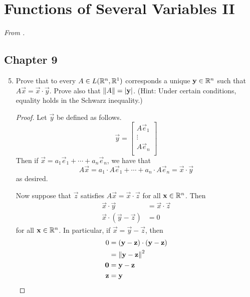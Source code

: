 \documentclass[../psets.tex]{subfiles}
\begin{document}
\section{Functions of Several Variables II}
\emph{From \textcite{bib:Rudin}.}
\subsection*{Chapter 9}
\begin{enumerate}[label={\textbf{\arabic*.}}]
    \setcounter{enumi}{4}
    \item {}Prove that to every $A\in L(\mathbb{R}^n,\mathbb{R}^1)$ corresponds a unique $\mathbf{y}\in\mathbb{R}^n$ such that $A\vec{x}=\vec{x}\cdot\vec{y}$. Prove also that $\norm{A}=|\mathbf{y}|$. (Hint: Under certain conditions, equality holds in the Schwarz inequality.)
    \begin{proof}
        Let $\vec{y}$ be defined as follows.
        \begin{equation*}
            \vec{y} =
            \begin{bmatrix}
                A\vec{e}_1\\
                \vdots\\
                A\vec{e}_n\\
            \end{bmatrix}
        \end{equation*}
        Then if $\vec{x}=a_1\vec{e}_1+\cdots+a_n\vec{e}_n$, we have that
        \begin{equation*}
            A\vec{x} = a_1\cdot A\vec{e}_1+\cdots+a_n\cdot A\vec{e}_n
            = \vec{x}\cdot\vec{y}
        \end{equation*}
        as desired.\par
        Now suppose that $\vec{z}$ satisfies $A\vec{x}=\vec{x}\cdot\vec{z}$ for all $\mathbf{x}\in\mathbb{R}^n$. Then
        \begin{align*}
            \vec{x}\cdot\vec{y} &= \vec{x}\cdot\vec{z}\\
            \vec{x}\cdot(\vec{y}-\vec{z}) &= 0
        \end{align*}
        for all $\mathbf{x}\in\mathbb{R}^n$. In particular, if $\vec{x}=\vec{y}-\vec{z}$, then
        \begin{align*}
            0 &= (\vec{y}-\vec{z})\cdot(\vec{y}-\vec{z})\\
            &= \norm{\vec{y}-\vec{z}}^2\\
            \bm{0} &= \vec{y}-\vec{z}\\
            \vec{z} &= \vec{y}

\end{align*}
\end{proof}
\end{enumerate}
\end{document}
